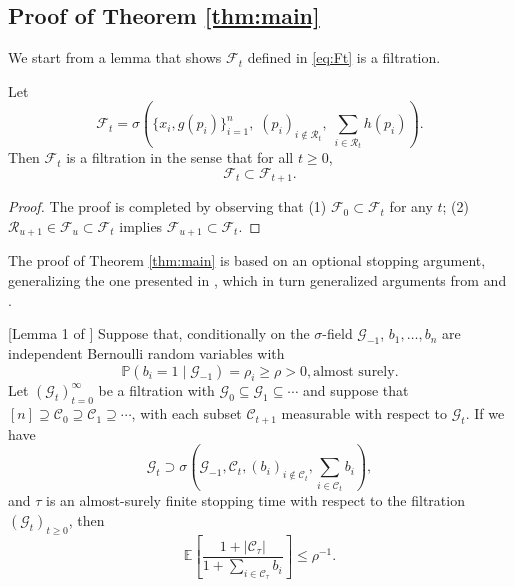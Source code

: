 \documentclass{biometrika}
\newcommand{\cF}{\mathcal{F}}
\newcommand{\cG}{\mathcal{G}}
\newcommand{\cC}{\mathcal{C}}
\newcommand{\cR}{\mathcal{R}}
\newcommand{\htt}{\tau}
\newcommand{\lb}{\left(}
\newcommand{\rb}{\right)}
\newcommand{\E}{\mathbb{E}}
\renewcommand{\P}{\mathbb{P}}
\newcommand{\1}{\mathbf{1}}
\begin{document}
\subsection{Proof of Theorem \ref{thm:main}}\label{subapp:proof_FDR}
We start from a lemma that shows $\cF_{t}$ defined in \eqref{eq:Ft} is a filtration.
\begin{lemma}\label{lem:Ft_filtration}
Let 
\[\cF_{t} = \sigma\lb \{x_{i}, g(p_{i})\}_{i=1}^{n},\;  (p_{i})_{i\notin \cR_{t}},\; \sum_{i\in \cR_{t}}h(p_{i})\rb.\]
Then $\cF_{t}$ is a filtration in the sense that for all $t\ge 0$,
\[\cF_{t}\subset \cF_{t+1}.\]
\end{lemma}
\begin{proof}
 The proof is completed by observing that (1) $\cF_{0} \subset \cF_{t}$ for any $t$; (2) $\cR_{u+1}\in \cF_{u}\subset \cF_{t}$ implies $\cF_{u+1}\subset \cF_{t}$.
\end{proof}


The proof of Theorem \ref{thm:main} is based on an optional stopping argument, generalizing the one presented in \citet{lei2016power}, which in turn generalized arguments from \citet{li2016accumulation} and \citet{barber2016knockoff}. 

\begin{lemma}\label{lem:bernoulli}[Lemma 1 of \citet{lei2018adapt}]
  Suppose that, conditionally on the $\sigma$-field $\cG_{-1}$, $b_1,\ldots,b_n$ are independent Bernoulli random variables with 
\[\P(b_i = 1 \mid \cG_{-1}) = \rho_i \geq \rho > 0, \mbox{almost surely}.\]
Let $(\cG_{t})_{t=0}^{\infty}$ be a filtration with $\cG_{0}\subseteq \cG_{1}\subseteq \cdots$ and suppose that $[n] \supseteq \cC_0 \supseteq \cC_1 \supseteq \cdots$, with each subset $\cC_{t+1}$ measurable with respect to $\cG_{t}$. If we have
  \[
  \cG_t \supset \sigma\left(\cG_{-1}, \cC_t, (b_i)_{i \notin \cC_t}, \sum_{i \in \cC_t} b_i\right),
  \]
  and $\htt$ is an almost-surely finite stopping time with respect to the filtration $(\cG_t)_{t \geq 0}$, then
  \[
  \E\left[\frac{1 + |\cC_{\htt}|}{1 + \sum_{i\in \cC_{\htt}} b_i} \right]  \leq \rho^{-1}.
  \]
\end{lemma}
\end{document}

